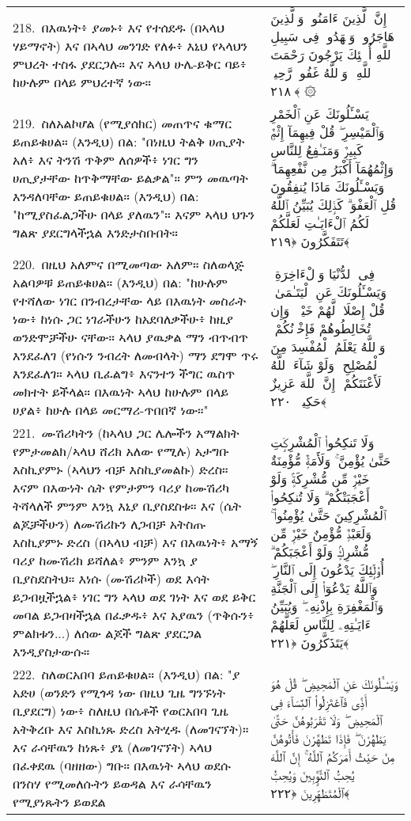 \documentclass[11pt,a4paper,oneside]{article}%
\newcommand{\mytextarabic}[1]{\textarabic{ #1 \flushright}}
\begin{document}
\begin{longtable}{%
  @{}
    p{}
  @{~~~}
    p{}
    @{}
}
218.\ በእዉነት፥ ያመኑ፥ እና የተሰደዱ (በኣላህ ሃይማኖት) እና በኣላህ መንገድ የለፉ፥ እኒህ የኣላህን ምህረት ተስፋ ያደርጋሉ። እና ኣላህ ሁሌ-ይቅር ባይ፥ ከሁሉም በላይ ምህረተኛ ነው። &  \mytextarabic{  إِنَّ ٱلَّذِينَ ءَامَنُوا۟ وَٱلَّذِينَ هَاجَرُوا۟ وَجَٟهَدُوا۟ فِى سَبِيلِ ٱللَّهِ أُو۟لَٟٓئِكَ يَرْجُونَ رَحْمَتَ ٱللَّهِ ۚ وَٱللَّهُ غَفُورٌۭ رَّحِيمٌۭ ﴿٢١٨﴾ ۞ }\\
219.\ ስለአልኮሆል (የሚያሰክር) መጠጥና ቁማር ይጠይቁሀል። (እንዲህ) በል: "በነዚህ ትልቅ ሀጢያት አለ፥ እና ትንሽ ጥቅም ለሰዎች፥ ነገር ግን ሀጢያታቸው ከጥቅማቸው ይልቃል"። ምን መዉጣት እንዳለባቸው ይጠይቁሀል። (እንዲህ) በል: "ከሚያስፈልጋችሁ በላይ ያለዉን"። እናም ኣላህ ህጉን ግልጽ ያደርግላችኋል እንድታስቡበት። &  \mytextarabic{ يَسْـَٔلُونَكَ عَنِ ٱلْخَمْرِ وَٱلْمَيْسِرِ ۖ قُلْ فِيهِمَآ إِثْمٌۭ كَبِيرٌۭ وَمَنَـٰفِعُ لِلنَّاسِ وَإِثْمُهُمَآ أَكْبَرُ مِن نَّفْعِهِمَا ۗ وَيَسْـَٔلُونَكَ مَاذَا يُنفِقُونَ قُلِ ٱلْعَفْوَ ۗ كَذَٟلِكَ يُبَيِّنُ ٱللَّهُ لَكُمُ ٱلْءَايَـٰتِ لَعَلَّكُمْ تَتَفَكَّرُونَ ﴿٢١٩﴾}\\
220.\ በዚህ አለምና በሚመጣው አለም። ስለወላጅ አልባዎቹ ይጠይቁሀል። (እንዲህ) በል: "ከሁሉም የተሻለው ነገር በንብረታቸው ላይ በእዉነት መስራት ነው፥ ከነሱ ጋር ነገራችሁን ከአደባለቃችሁ፥ ከዚያ ወንድሞቻችሁ ናቸው። ኣላህ ያዉቃል ማን ብጥብጥ እንደፈለገ (የነሱን ንብረት ለመብላት) ማን ደግሞ ጥሩ እንደፈለገ። ኣላህ ቢፈልግ፥ እናንተን ችግር ዉስጥ መክተት ይችላል። በእዉነት ኣላህ ከሁሉም በላይ ሀያል፥ ከሁሉ በላይ መርማሪ-ጥበበኛ ነው።" &  \mytextarabic{فِى ٱلدُّنْيَا وَٱلْءَاخِرَةِ ۗ وَيَسْـَٔلُونَكَ عَنِ ٱلْيَتَـٰمَىٰ ۖ قُلْ إِصْلَاحٌۭ لَّهُمْ خَيْرٌۭ ۖ وَإِن تُخَالِطُوهُمْ فَإِخْوَٟنُكُمْ ۚ وَٱللَّهُ يَعْلَمُ ٱلْمُفْسِدَ مِنَ ٱلْمُصْلِحِ ۚ وَلَوْ شَآءَ ٱللَّهُ لَأَعْنَتَكُمْ ۚ إِنَّ ٱللَّهَ عَزِيزٌ حَكِيمٌۭ ﴿٢٢٠﴾}\\
221.\ ሙሽሪካትን (ከኣላህ ጋር ሌሎችን አማልክት የምታመልክ/ኣላህ ሸሪክ አለው የሚሉ) አታግቡ እስኪያምኑ (ኣላህን ብቻ እስኪያመልኩ) ድረስ። እናም በእውነት ሴት የምታምን ባሪያ ከሙሽሪካ ትሻላለች ምንም እንኳ እኒያ ቢያስደስቱ። እና (ሴት ልጆቻችሁን) ለሙሽሪኩን ለጋብቻ አትስጡ እስኪያምኑ ድረስ (በኣላህ ብቻ) እና በእዉነት፥ አማኝ ባሪያ ከሙሽሪክ ይሻለል፥ ምንም እንኳ ያ ቢያስደስትህ። እነሱ (ሙሽሪኮች) ወደ እሳት ይጋብዟችኋል፥ ነገር ግን ኣላህ ወደ ገነት እና ወደ ይቅር መባል ይጋብዛችኋል በፈቃዱ፥ እና አያዉን (ጥቅሱን፥ ምልክቱን...) ለሰው ልጆች ግልጽ ያደርጋል እንዲያስታውሱ። &  \mytextarabic{وَلَا تَنكِحُوا۟ ٱلْمُشْرِكَٟتِ حَتَّىٰ يُؤْمِنَّ ۚ وَلَأَمَةٌۭ مُّؤْمِنَةٌ خَيْرٌۭ مِّن مُّشْرِكَةٍۢ وَلَوْ أَعْجَبَتْكُمْ ۗ وَلَا تُنكِحُوا۟ ٱلْمُشْرِكِينَ حَتَّىٰ يُؤْمِنُوا۟ ۚ وَلَعَبْدٌۭ مُّؤْمِنٌ خَيْرٌۭ مِّن مُّشْرِكٍۢ وَلَوْ أَعْجَبَكُمْ ۗ أُو۟لَٟٓئِكَ يَدْعُونَ إِلَى ٱلنَّارِ ۖ وَٱللَّهُ يَدْعُوٓا۟ إِلَى ٱلْجَنَّةِ وَٱلْمَغْفِرَةِ بِإِذْنِهِۦ ۖ وَيُبَيِّنُ ءَايَـٰتِهِۦ لِلنَّاسِ لَعَلَّهُمْ يَتَذَكَّرُونَ ﴿٢٢١﴾}\\
222.\ ስለወርአበባ ይጠይቁሀል። (እንዲህ) በል: "ያ አድሀ (ወንድን የሚጎዳ ነው በዚህ ጊዜ ግንኙነት ቢያደርግ) ነው፥ ስለዚህ በሴቶች የወርአበባ ጊዜ አትቅረቡ እና እስኪነጹ ድረስ አትሂዱ (ለመገናኘት)። እና ራሳቸዉን ከነጹ፥ ያኔ (ለመገናኘት) ኣላህ በፈቀደዉ (ባዘዘው) ግቡ። በእዉነት ኣላህ ወደሱ በንስሃ የሚመለሱትን ይወዳል እና ራሳቸዉን የሚያነጹትን ይወደል &  \mytextarabic{وَيَسْـَٔلُونَكَ عَنِ ٱلْمَحِيضِ ۖ قُلْ هُوَ أَذًۭى فَٱعْتَزِلُوا۟ ٱلنِّسَآءَ فِى ٱلْمَحِيضِ ۖ وَلَا تَقْرَبُوهُنَّ حَتَّىٰ يَطْهُرْنَ ۖ فَإِذَا تَطَهَّرْنَ فَأْتُوهُنَّ مِنْ حَيْثُ أَمَرَكُمُ ٱللَّهُ ۚ إِنَّ ٱللَّهَ يُحِبُّ ٱلتَّوَّٟبِينَ وَيُحِبُّ ٱلْمُتَطَهِّرِينَ ﴿٢٢٢﴾}\\

\end{longtable}
\end{document}
